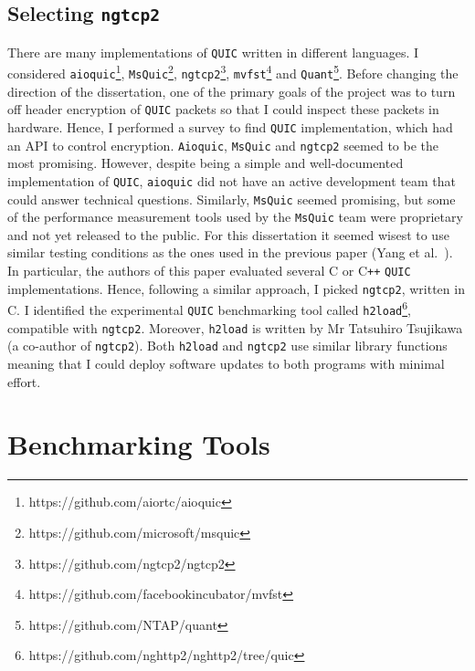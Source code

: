 \documentclass[12pt,a4paper]{report}
\begin{document}
\subsection{Selecting  \texttt{ngtcp2}}
There are many implementations of \texttt{QUIC} written in different languages.
I considered  \texttt{aioquic}\footnote{https://github.com/aiortc/aioquic},  \texttt{MsQuic}\footnote{https://github.com/microsoft/msquic},  \texttt{ngtcp2}\footnote{https://github.com/ngtcp2/ngtcp2},  \texttt{mvfst}\footnote{https://github.com/facebookincubator/mvfst} and \texttt{Quant}\footnote{https://github.com/NTAP/quant}.
Before changing the direction of the dissertation, one of the primary goals of the project was to turn off header encryption of \texttt{QUIC} packets so that I could inspect these packets in hardware.
Hence, I performed a survey to find \texttt{QUIC} implementation, which had an API to control encryption. 
\texttt{Aioquic}, \texttt{MsQuic} and \texttt{ngtcp2} seemed to be the most promising.
However, despite being a simple and well-documented implementation of \texttt{QUIC}, \texttt{aioquic} did not have an active development team that could answer technical questions.
Similarly, \texttt{MsQuic} seemed promising, but some of the performance measurement tools used by the \texttt{MsQuic} team were proprietary and not yet released to the public. 
For this dissertation it seemed wisest to use similar testing conditions as the ones used in the previous paper (Yang et al.~\cite{Making_QUIC_Quicker}).
In particular, the authors of this paper evaluated several C or C\texttt{++} \texttt{QUIC} implementations.
Hence, following a similar approach, I picked \texttt{ngtcp2}, written in C.
I identified the experimental \texttt{QUIC} benchmarking tool called \texttt{h2load}\footnote{https://github.com/nghttp2/nghttp2/tree/quic}, compatible with \texttt{ngtcp2}.
Moreover, \texttt{h2load} is written by Mr Tatsuhiro  Tsujikawa (a co-author of \texttt{ngtcp2}).
Both \texttt{h2load} and \texttt{ngtcp2} use similar library functions meaning that I could deploy software updates to both programs with minimal effort.





\section{Benchmarking Tools}
\end{document}

